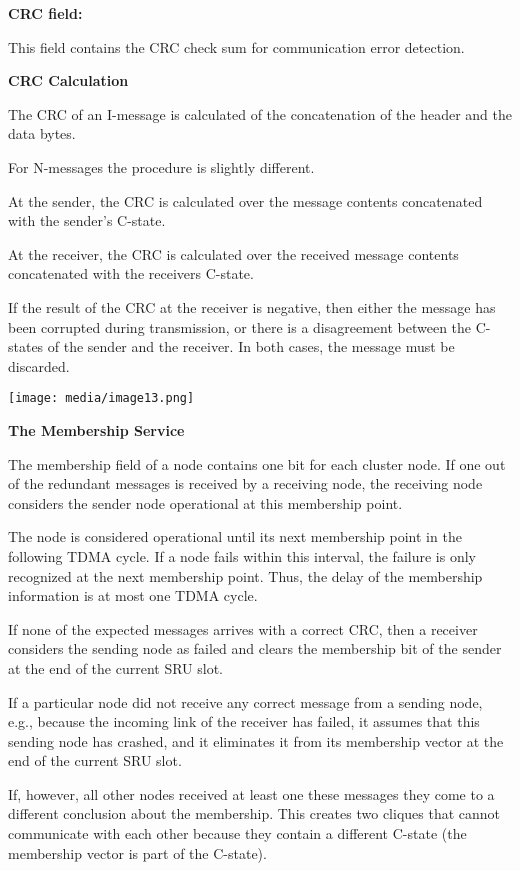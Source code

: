 \textbf{CRC field:}

This field contains the CRC check sum for communication error detection.

\textbf{CRC Calculation}

The CRC of an I-message is calculated of the concatenation of the header
and the data bytes.

For N-messages the procedure is slightly different.

At the sender, the CRC is calculated over the message contents
concatenated with the sender's C-state.

At the receiver, the CRC is calculated over the received message
contents concatenated with the receivers C-state.

If the result of the CRC at the receiver is negative, then either the
message has been corrupted during transmission, or there is a
disagreement between the C-states of the sender and the receiver. In
both cases, the message must be discarded.

\texttt{[image: media/image13.png]}

\textbf{The Membership Service}

The membership field of a node contains one bit for each cluster node.
If one out of the redundant messages is received by a receiving node,
the receiving node considers the sender node operational at this
membership point.

The node is considered operational until its next membership point in
the following TDMA cycle. If a node fails within this interval, the
failure is only recognized at the next membership point. Thus, the delay
of the membership information is at most one TDMA cycle.

If none of the expected messages arrives with a correct CRC, then a
receiver considers the sending node as failed and clears the membership
bit of the sender at the end of the current SRU slot.

If a particular node did not receive any correct message from a sending
node, e.g., because the incoming link of the receiver has failed, it
assumes that this sending node has crashed, and it eliminates it from
its membership vector at the end of the current SRU slot.

If, however, all other nodes received at least one these messages they
come to a different conclusion about the membership. This creates two
cliques that cannot communicate with each other because they contain a
different C-state (the membership vector is part of the C-state).

